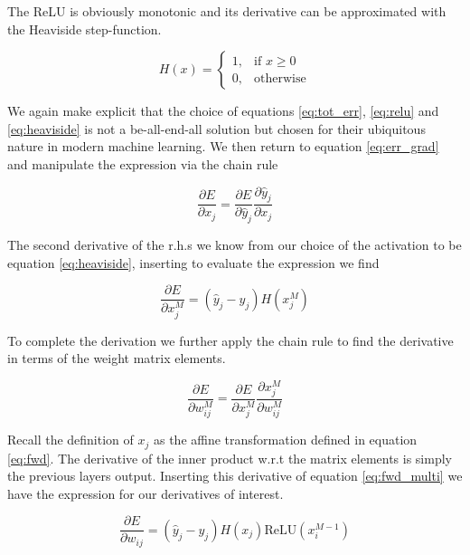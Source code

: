 \noindent The ReLU is obviously monotonic and its derivative can be approximated with the Heaviside step-function. 

\begin{equation}\label{eq:heaviside}
H(x) = 	\begin{cases}1, & \text{if } x \geq 0 \\
	0,  & \text{otherwise}
\end{cases}
\end{equation}

\noindent We again make explicit that the choice of equations \ref{eq:tot_err}, \ref{eq:relu} and \ref{eq:heaviside} is not a be-all-end-all solution but chosen for their ubiquitous nature in modern machine learning. We then return to equation \ref{eq:err_grad} and manipulate the expression via the chain rule 

\begin{equation}
\frac{\partial E}{\partial x_{j}}= \frac{\partial E}{\partial \hat{y}_{j}}\frac{\partial \hat{y}_{j}}{\partial x_{j}}
\end{equation}

\noindent The second derivative of the r.h.s we know from our choice of the activation to be equation \ref{eq:heaviside}, inserting to evaluate the expression we find 

\begin{equation}\label{eq:dedx}
\frac{\partial E}{\partial x_{j}^M} = (\hat{y}_{j} - y_{j}) H(x_j^M)
\end{equation}

\noindent To complete the derivation we further apply the chain rule to find the derivative in terms of the weight matrix elements.

\begin{equation}
\frac{\partial E}{\partial w_{ij}^M} = \frac{\partial E}{\partial x_{j}^M} \frac{\partial x_{j}^M}{\partial w_{ij}^M} 
\end{equation}

\noindent Recall the definition of $x_j$ as the affine transformation defined in equation \ref{eq:fwd}. The derivative of the inner product w.r.t the matrix elements is simply the previous layers output. Inserting this derivative of equation \ref{eq:fwd_multi} we have the expression for our derivatives of interest.

\begin{equation}\label{eq:dedw}
\frac{\partial E}{\partial w_{ij}} = (\hat{y}_{j} - y_{j}) H(x_j) \text{ReLU}(x_i^{M-1})
\end{equation}

